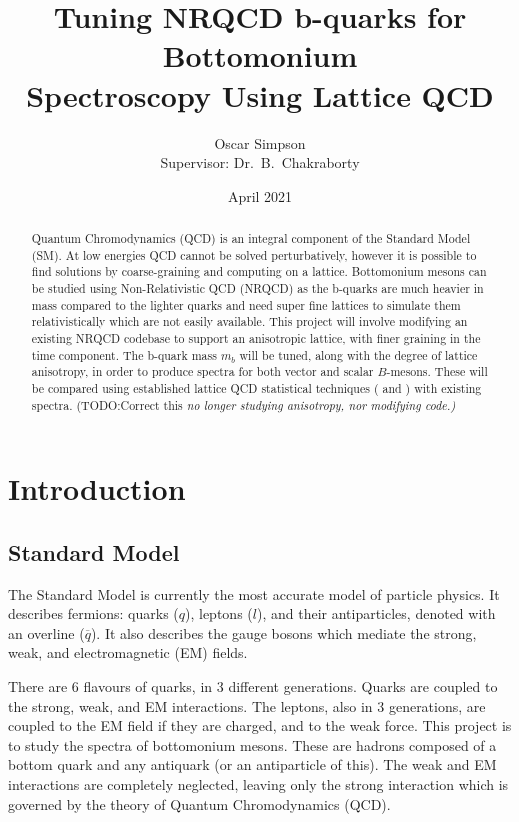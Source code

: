 \documentclass[a4paper,12pt]{article}
\title{Tuning NRQCD b-quarks for Bottomonium \\ Spectroscopy Using Lattice QCD}
\author{Oscar Simpson \\ Supervisor: Dr.\ B.\ Chakraborty}
\date{April 2021}
\begin{document}
\maketitle
\begin{abstract}
    Quantum Chromodynamics (QCD) is an integral component of the Standard Model (SM). At low energies QCD cannot be solved perturbatively, however it is possible to find solutions by coarse-graining and computing on a lattice. Bottomonium mesons can be studied using Non-Relativistic QCD (NRQCD) as the b-quarks are much heavier in mass compared to the lighter quarks and need super fine lattices to simulate them relativistically which are not easily available. This project will involve modifying an existing NRQCD codebase to support an anisotropic lattice, with finer graining in the time component. The b-quark mass $m_b$ will be tuned, along with the degree of lattice anisotropy, in order to produce spectra for both vector and scalar $B$-mesons. These will be compared using established lattice QCD statistical techniques ( and ) with existing spectra. (TODO:\@ Correct this \em no longer studying anisotropy, nor modifying code.)
\end{abstract}

\tableofcontents
\pagebreak

\section{Introduction}
\subsection{Standard Model}
The Standard Model is currently the most accurate model of particle physics. It describes fermions: quarks ($q$), leptons ($l$), and their antiparticles, denoted with an overline ($\overline{q}$). It also describes the gauge bosons which mediate the strong, weak, and electromagnetic (EM) fields. 

There are 6 flavours of quarks, in 3 different generations. Quarks are coupled to the strong, weak, and EM interactions. The leptons, also in 3 generations, are coupled to the EM field if they are charged, and to the weak force. This project is to study the spectra of bottomonium mesons. These are hadrons composed of a bottom quark and any antiquark (or an antiparticle of this). The weak and EM interactions are completely neglected, leaving only the strong interaction which is governed by the theory of Quantum Chromodynamics (QCD).
\end{document}
